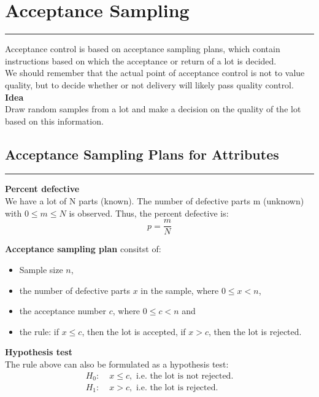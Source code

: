 \section{Acceptance Sampling}
\noindent\rule[\linienAbstand]{\linewidth}{\linienDickeDick}
Acceptance control is based on acceptance sampling plans, which contain instructions based on which the acceptance or return of a lot is decided.\\
We should remember that the actual point of acceptance control is not to value quality, but to decide whether or not delivery will likely pass quality control.\\

\textbf{Idea}\\
Draw random samples from a lot and make a decision on the quality of the lot based on this information.

\subsection{Acceptance Sampling Plans for Attributes}
\noindent\rule[\linienAbstand]{\linewidth}{\linienDicke}
\textbf{Percent defective}\\
We have a lot of N parts (known). The number of defective parts m (unknown) with $0 \leq m \leq N$ is observed. Thus, the percent defective is:
\begin{equation}
  p = \frac{m}{N}
\end{equation}

\textbf{Acceptance sampling plan} consitst of:
\begin{itemize}
  \item Sample size $n$,
  \item the number of defective parts $x$ in the sample, where $0 \leq x < n$,
  \item the acceptance number $c$, where $0 \leq c < n$ and
  \item the rule: if $x \leq c$, then the lot is accepted, if $x > c$, then the lot is rejected.
\end{itemize}

\textbf{Hypothesis test}\\
The rule above can also be formulated as a hypothesis test:
\begin{equation}
  \begin{split}
    H_0:\; & x \leq c,\text{ i.e. the lot is not rejected.}\\
    H_1:\; & x > c,\text{ i.e. the lot is rejected.}\\
  \end{split}
\end{equation}

